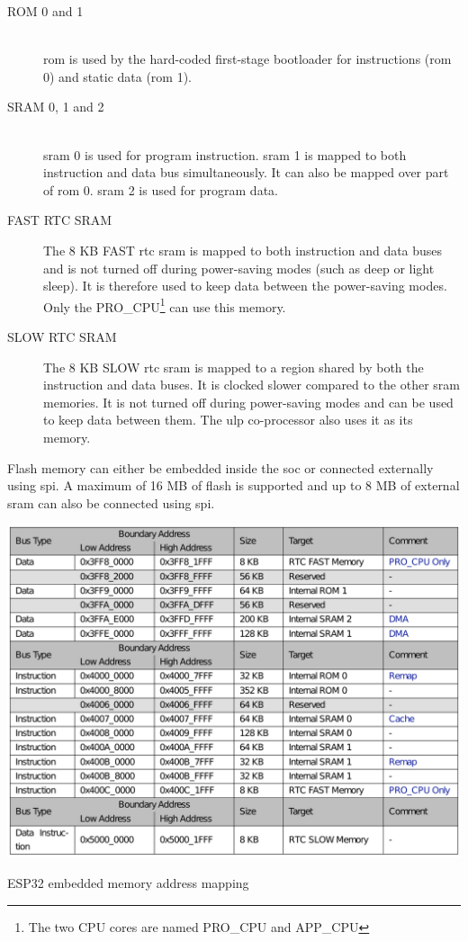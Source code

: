 \begin{description}
    \item[ROM 0 and 1] \hfill \\
        \Gls{rom} is used by the hard-coded first-stage bootloader for instructions (\gls{rom} 0) and static data (\gls{rom} 1).
    \item[SRAM 0, 1 and 2] \hfill \\
        \Gls{sram} 0 is used for program instruction. \Gls{sram} 1 is mapped to both instruction and data bus simultaneously. It can also be mapped over part of \gls{rom} 0. \Gls{sram} 2 is used for program data.
    \item[FAST RTC SRAM] The 8 KB FAST \gls{rtc} \gls{sram} is mapped to both instruction and data buses and is not turned off during power-saving modes (such as deep or light sleep). It is therefore used to keep data between the power-saving modes. Only the PRO\_CPU\footnote{The two CPU cores are named PRO\_CPU and APP\_CPU} can use this memory.
    \item[SLOW RTC SRAM] The 8 KB SLOW \gls{rtc} \gls{sram} is mapped to a region shared by both the instruction and data buses. It is clocked slower compared to the other \gls{sram} memories. It is not turned off during power-saving modes and can be used to keep data between them. The \gls{ulp} co-processor also uses it as its memory.
\end{description}

Flash memory can either be embedded inside the \gls{soc} or connected externally using \gls{spi}. A maximum of 16 MB of flash is supported and up to 8 MB of external \gls{sram} can also be connected using \gls{spi}.

\begin{table}[ht!]
    \centering
    \captionsetup{justification=centering,margin=0.5cm}
    \includegraphics[width=\textwidth]{images/memory_mapping.pdf}
    \caption[ESP32 embedded memory address mapping]{ESP32 embedded memory address mapping~\cite{esp322021}}
    \label{table:memory_mapping}
\end{table}

